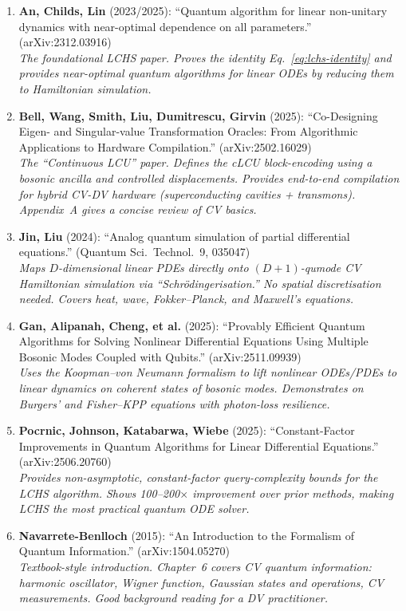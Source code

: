 \documentclass[11pt]{article}
\begin{document}
\begin{enumerate}[nosep]
\item \textbf{An, Childs, Lin} (2023/2025):
  ``Quantum algorithm for linear non-unitary dynamics with near-optimal
  dependence on all parameters.'' (arXiv:2312.03916)\\
  \emph{The foundational LCHS paper.  Proves the identity
  Eq.~\eqref{eq:lchs-identity} and provides near-optimal quantum
  algorithms for linear ODEs by reducing them to Hamiltonian simulation.}

\item \textbf{Bell, Wang, Smith, Liu, Dumitrescu, Girvin} (2025):
  ``Co-Designing Eigen- and Singular-value Transformation Oracles:
  From Algorithmic Applications to Hardware Compilation.''
  (arXiv:2502.16029)\\
  \emph{The ``Continuous LCU'' paper.  Defines the cLCU block-encoding
  using a bosonic ancilla and controlled displacements.  Provides
  end-to-end compilation for hybrid CV-DV hardware (superconducting
  cavities + transmons).  Appendix~A gives a concise review of CV
  basics.}

\item \textbf{Jin, Liu} (2024):
  ``Analog quantum simulation of partial differential equations.''
  (Quantum Sci.\ Technol.\ 9, 035047)\\
  \emph{Maps $D$-dimensional linear PDEs directly onto $(D+1)$-qumode
  CV Hamiltonian simulation via ``Schr\"odingerisation.''
  No spatial discretisation needed.  Covers heat, wave, Fokker--Planck,
  and Maxwell's equations.}

\item \textbf{Gan, Alipanah, Cheng, et al.} (2025):
  ``Provably Efficient Quantum Algorithms for Solving Nonlinear
  Differential Equations Using Multiple Bosonic Modes Coupled with
  Qubits.'' (arXiv:2511.09939)\\
  \emph{Uses the Koopman--von Neumann formalism to lift nonlinear ODEs/PDEs
  to linear dynamics on coherent states of bosonic modes.  Demonstrates
  on Burgers' and Fisher--KPP equations with photon-loss resilience.}

\item \textbf{Pocrnic, Johnson, Katabarwa, Wiebe} (2025):
  ``Constant-Factor Improvements in Quantum Algorithms for Linear
  Differential Equations.'' (arXiv:2506.20760)\\
  \emph{Provides non-asymptotic, constant-factor query-complexity bounds
  for the LCHS algorithm.  Shows 100--200$\times$ improvement over
  prior methods, making LCHS the most practical quantum ODE solver.}

\item \textbf{Navarrete-Benlloch} (2015):
  ``An Introduction to the Formalism of Quantum Information.''
  (arXiv:1504.05270)\\
  \emph{Textbook-style introduction.  Chapter~6 covers CV quantum
  information: harmonic oscillator, Wigner function, Gaussian states
  and operations, CV measurements.  Good background reading for a
  DV practitioner.}
\end{enumerate}
\end{document}
